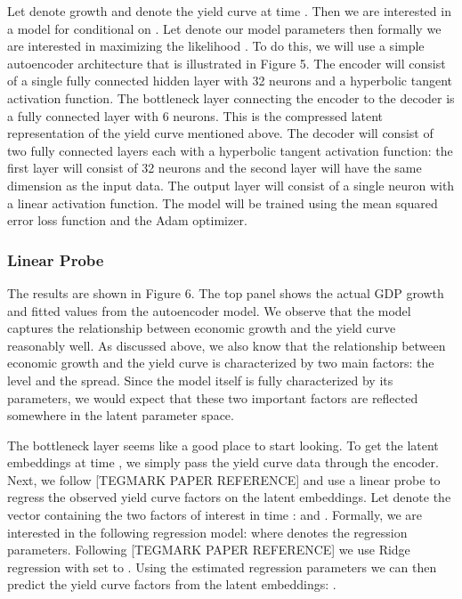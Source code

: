 \documentclass{article}
\theoremstyle{plain}
\theoremstyle{definition}
\theoremstyle{remark}
\begin{document}
Let 
 denote growth and 
 denote the yield curve at time 
. Then we are interested in a model for 
 conditional on 
. Let 
 denote our model parameters then formally we are interested in maximizing the likelihood 
. To do this, we will use a simple autoencoder architecture that is illustrated in Figure 5. The encoder will consist of a single fully connected hidden layer with 32 neurons and a hyperbolic tangent activation function. The bottleneck layer connecting the encoder to the decoder is a fully connected layer with 6 neurons. This is the compressed latent representation of the yield curve mentioned above. The decoder will consist of two fully connected layers each with a hyperbolic tangent activation function: the first layer will consist of 32 neurons and the second layer will have the same dimension as the input data. The output layer will consist of a single neuron with a linear activation function. The model will be trained using the mean squared error loss function and the Adam optimizer.

\subsubsection{Linear Probe}

The results are shown in Figure 6. The top panel shows the actual GDP growth and fitted values from the autoencoder model. We observe that the model captures the relationship between economic growth and the yield curve reasonably well. As discussed above, we also know that the relationship between economic growth and the yield curve is characterized by two main factors: the level and the spread. Since the model itself is fully characterized by its parameters, we would expect that these two important factors are reflected somewhere in the latent parameter space.

The bottleneck layer seems like a good place to start looking. To get the latent embeddings 
 at time 
, we simply pass the yield curve data 
 through the encoder. Next, we follow [TEGMARK PAPER REFERENCE] and use a linear probe to regress the observed yield curve factors on the latent embeddings. Let 
 denote the vector containing the two factors of interest in time 
: 
 and 
. Formally, we are interested in the following regression model: 
 where 
 denotes the regression parameters. Following [TEGMARK PAPER REFERENCE] we use Ridge regression with 
 set to 
. Using the estimated regression parameters 
 we can then predict the yield curve factors from the latent embeddings: 
.
\end{document}

